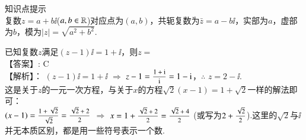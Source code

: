 \begin{exercise}
         \begin{framed}{\heiti 知识点提示}\\
            复数$z=a+b\ii$($a,b\in\mathbb{R}$)对应点为$(a,b)$，共轭复数为$\bar z=a-b\ii$，实部为$a$，虚部为$b$，模为$|z|=\sqrt{a^2+b^2}$.
         \end{framed}
    \item %
       已知复数$z$满足$(z-1)\ii=1+\ii$，则$z=$\xz
         \\{\heiti 【答案】:}
             C
         \\{\heiti 【解析】：}
           $(z-1)\ii=1+\ii$ $\Rightarrow$ $z-1=\mfrac{1+\ii}{\ii}=1-\ii$，$\therefore$ $z=2-\ii$.\\
           {\kaishu {} 这是关于$z$的一元一次方程，与关于$x$的方程$\sqrt2(x-1)=1+\sqrt2$一样的解法即可：\\
            $(x-1)=\mfrac{1+\sqrt2}{\sqrt2}=\mfrac{\sqrt2+2}2$ $\Rightarrow$ $x=1+\mfrac{\sqrt2+2}2=\mfrac{\sqrt2+4}2$
            (或写为$2+\mfrac{\sqrt2}2$).这里的$\sqrt2$与$\ii$并无本质区别，都是用一些符号表示一个数.}
    \begin{comment}
      \item %
        \source{2015文}{全国新课标II-2}
        若$a$为实数，且$\mfrac{2+a\ii}{1+\ii}=3+\ii$，则$a=$\xz
        \xx{$-4$}{$-3$}{$3$}{$4$}
          \\{\heiti 【答案】:}
              D
          \\{\heiti 【解析】：}
            $\mfrac{2+a\ii}{1+\ii}=3+\ii$ $\Rightarrow$ $2+a\ii=(1+\ii)(3+\ii)=2+4\ii$，$\therefore$ $a=2$.\\
    \end{comment}
  \end{exercise}
